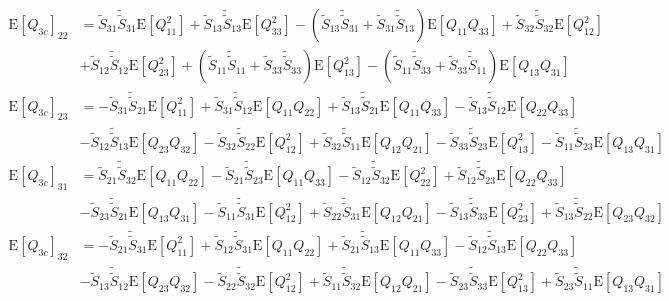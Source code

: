 \documentclass[10pt]{article}
\newcommand{\expect}[1]{\ensuremath{\mathrm{E}\left[ #1 \right]}}
\begin{document}
\begin{align}
	\expect{Q_{3c}}_{22} &= \tilde{S}_{31}\tilde{\tilde{S}}_{31}\expect{Q_{11}^2} + \tilde{S}_{13}\tilde{\tilde{S}}_{13}\expect{Q_{33}^2} - \left( \tilde{S}_{13}\tilde{\tilde{S}}_{31}+\tilde{S}_{31}\tilde{\tilde{S}}_{13} \right)\expect{Q_{11}Q_{33}} + \tilde{S}_{32}\tilde{\tilde{S}}_{32}\expect{Q_{12}^2} \nonumber \\
	&+ \tilde{S}_{12}\tilde{\tilde{S}}_{12}\expect{Q_{23}^2} + \left( \tilde{S}_{11}\tilde{\tilde{S}}_{11}+\tilde{S}_{33}\tilde{\tilde{S}}_{33} \right)\expect{Q_{13}^2} - \left( \tilde{S}_{11}\tilde{\tilde{S}}_{33}+\tilde{S}_{33}\tilde{\tilde{S}}_{11} \right)\expect{Q_{13}Q_{31}} \nonumber \\
	\expect{Q_{3c}}_{23} &= -\tilde{S}_{31}\tilde{\tilde{S}}_{21}\expect{Q_{11}^2} + \tilde{S}_{31}\tilde{\tilde{S}}_{12}\expect{Q_{11}Q_{22}} + \tilde{S}_{13}\tilde{\tilde{S}}_{21}\expect{Q_{11}Q_{33}} - \tilde{S}_{13}\tilde{\tilde{S}}_{12}\expect{Q_{22}Q_{33}} \nonumber \\
	&- \tilde{S}_{12}\tilde{\tilde{S}}_{13}\expect{Q_{23}Q_{32}} - \tilde{S}_{32}\tilde{\tilde{S}}_{22}\expect{Q_{12}^2} + \tilde{S}_{32}\tilde{\tilde{S}}_{11}\expect{Q_{12}Q_{21}} - \tilde{S}_{33}\tilde{\tilde{S}}_{23}\expect{Q_{13}^2} - \tilde{S}_{11}\tilde{\tilde{S}}_{23}\expect{Q_{13}Q_{31}} \nonumber \\
	\expect{Q_{3c}}_{31} &= \tilde{S}_{21}\tilde{\tilde{S}}_{32}\expect{Q_{11}Q_{22}} - \tilde{S}_{21}\tilde{\tilde{S}}_{23}\expect{Q_{11}Q_{33}} - \tilde{S}_{12}\tilde{\tilde{S}}_{32}\expect{Q_{22}^2} + \tilde{S}_{12}\tilde{\tilde{S}}_{23}\expect{Q_{22}Q_{33}} \nonumber \\
	&- \tilde{S}_{23}\tilde{\tilde{S}}_{21}\expect{Q_{13}Q_{31}} - \tilde{S}_{11}\tilde{\tilde{S}}_{31}\expect{Q_{12}^2} + \tilde{S}_{22}\tilde{\tilde{S}}_{31}\expect{Q_{12}Q_{21}} - \tilde{S}_{13}\tilde{\tilde{S}}_{33}\expect{Q_{23}^2} + \tilde{S}_{13}\tilde{\tilde{S}}_{22}\expect{Q_{23}Q_{32}} \nonumber \\
	\expect{Q_{3c}}_{32} &= -\tilde{S}_{21}\tilde{\tilde{S}}_{31}\expect{Q_{11}^2} + \tilde{S}_{12}\tilde{\tilde{S}}_{31}\expect{Q_{11}Q_{22}} + \tilde{S}_{21}\tilde{\tilde{S}}_{13}\expect{Q_{11}Q_{33}} - \tilde{S}_{12}\tilde{\tilde{S}}_{13}\expect{Q_{22}Q_{33}} \nonumber \\
	&- \tilde{S}_{13}\tilde{\tilde{S}}_{12}\expect{Q_{23}Q_{32}} - \tilde{S}_{22}\tilde{\tilde{S}}_{32}\expect{Q_{12}^2} + \tilde{S}_{11}\tilde{\tilde{S}}_{32}\expect{Q_{12}Q_{21}} - \tilde{S}_{23}\tilde{\tilde{S}}_{33}\expect{Q_{13}^2} + \tilde{S}_{23}\tilde{\tilde{S}}_{11}\expect{Q_{13}Q_{31}} \nonumber \\

\end{align}
\end{document}
